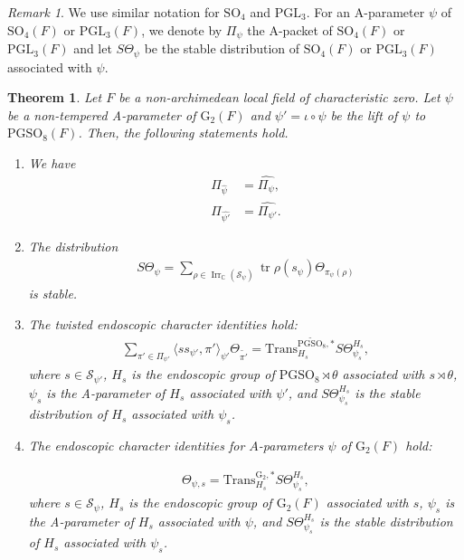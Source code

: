 \documentclass[12pt]{amsart}
\theoremstyle{definition}
\theoremstyle{plain}
\newtheorem{theorem}[definition]{Theorem}
\theoremstyle{remark}
\newtheorem{remark}[definition]{Remark}
\def\C{\mathbb{C}}%
\def\PGL{\mathrm{PGL}}
\def\SO{\mathrm{SO}}
\def\PGSO{\mathrm{PGSO}}
\DeclareMathOperator{\Irr}{Irr}%
\DeclareMathOperator{\tr}{tr}%
\newcommand{\cS}{\mathcal{S}}
\numberwithin{equation}{section}
\newcommand{\rG}{\mathrm{G}}
\newcommand{\Trans}{\mathrm{Trans}}
\begin{document}
\begin{remark}
      We use similar notation for $\SO_4$ and $\PGL_3$.
      For an A-parameter $\psi$ of $\SO_4(F)$ or $\PGL_3(F)$, we denote by $\Pi_{\psi}$ the A-packet of $\SO_4(F)$ or $\PGL_3(F)$ and let $S\Theta_{\psi}$ be the stable distribution of $\SO_4(F)$ or $\PGL_3(F)$ associated with $\psi$.
\end{remark}

\begin{theorem}\label{thm:main-ecr}
      Let $F$ be a non-archimedean local field of characteristic zero.
      Let $\psi$ be a non-tempered A-parameter of $\rG_2(F)$ and $\psi' = \iota \circ \psi$ be the lift of $\psi$ to $\PGSO_8(F)$.
      Then, the following statements hold.
      \begin{enumerate}
            \item
            We have 
            \begin{align*}
                  \Pi_{\widehat{\psi}} &= \widehat{\Pi_{\psi}}, \\
                  \Pi_{\widehat{\psi'}} &= \widehat{\Pi_{\psi'}}.
            \end{align*}

            \item
            The distribution
            \begin{align*}
                  S\Theta_{\psi} = \sum_{\rho \in \Irr_{\C}(\cS_{\psi})} \tr\rho(s_{\psi}) \Theta_{\pi_{\psi}(\rho)}
            \end{align*}
            is stable.

            \item 
            The twisted endoscopic character identities hold:
            \begin{align*}
                  \sum_{\pi' \in \Pi_{\psi'}} \langle s s_{\psi'}, \pi' \rangle_{\psi'} \Theta_{\widetilde{\pi'}}
                  =
                  \Trans^{\widetilde{\PGSO_8}, *}_{H_s} S\Theta^{H_s}_{\psi_s},
            \end{align*}
            where $s \in \cS_{\psi'}$, $H_s$ is the endoscopic group of $\PGSO_8 \rtimes \theta$ associated with $s \rtimes \theta$, $\psi_s$ is the A-parameter of $H_s$ associated with $\psi'$, and $S\Theta^{H_s}_{\psi_s}$ is the stable distribution of $H_s$ associated with $\psi_s$.

            \item 
            The endoscopic character identities for $A$-parameters $\psi$ of $\rG_2(F)$ hold:

            \begin{align*}
                  \Theta_{\psi, s}
                  =
                  \Trans^{\rG_2, *}_{H_s} S\Theta^{H_s}_{\psi_s},
            \end{align*}
            where $s \in \cS_{\psi}$, $H_s$ is the endoscopic group of $\rG_2(F)$ associated with $s$, $\psi_s$ is the A-parameter of $H_s$ associated with $\psi$, and $S\Theta^{H_s}_{\psi_s}$ is the stable distribution of $H_s$ associated with $\psi_s$.
      \end{enumerate}
\end{theorem}
\end{document}
